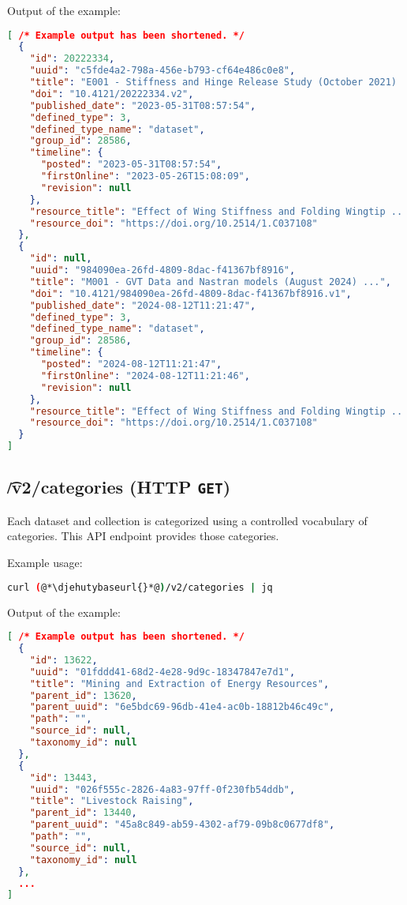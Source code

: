   Output of the example:
\begin{lstlisting}[language=JSON]
[ /* Example output has been shortened. */
  {
    "id": 20222334,
    "uuid": "c5fde4a2-798a-456e-b793-cf64e486c0e8",
    "title": "E001 - Stiffness and Hinge Release Study (October 2021) ...",
    "doi": "10.4121/20222334.v2",
    "published_date": "2023-05-31T08:57:54",
    "defined_type": 3,
    "defined_type_name": "dataset",
    "group_id": 28586,
    "timeline": {
      "posted": "2023-05-31T08:57:54",
      "firstOnline": "2023-05-26T15:08:09",
      "revision": null
    },
    "resource_title": "Effect of Wing Stiffness and Folding Wingtip ...",
    "resource_doi": "https://doi.org/10.2514/1.C037108"
  },
  {
    "id": null,
    "uuid": "984090ea-26fd-4809-8dac-f41367bf8916",
    "title": "M001 - GVT Data and Nastran models (August 2024) ...",
    "doi": "10.4121/984090ea-26fd-4809-8dac-f41367bf8916.v1",
    "published_date": "2024-08-12T11:21:47",
    "defined_type": 3,
    "defined_type_name": "dataset",
    "group_id": 28586,
    "timeline": {
      "posted": "2024-08-12T11:21:47",
      "firstOnline": "2024-08-12T11:21:46",
      "revision": null
    },
    "resource_title": "Effect of Wing Stiffness and Folding Wingtip ...",
    "resource_doi": "https://doi.org/10.2514/1.C037108"
  }
]
\end{lstlisting}

\subsection{\t{/v2/categories} (HTTP \texttt{GET})}
\label{sec:v2-categories}

  Each dataset and collection is categorized using a controlled vocabulary
  of categories.  This API endpoint provides those categories.

  Example usage:
\begin{lstlisting}[language=bash]
curl (@*\djehutybaseurl{}*@)/v2/categories | jq
\end{lstlisting}

  Output of the example:
\begin{lstlisting}[language=JSON]
[ /* Example output has been shortened. */
  {
    "id": 13622,
    "uuid": "01fddd41-68d2-4e28-9d9c-18347847e7d1",
    "title": "Mining and Extraction of Energy Resources",
    "parent_id": 13620,
    "parent_uuid": "6e5bdc69-96db-41e4-ac0b-18812b46c49c",
    "path": "",
    "source_id": null,
    "taxonomy_id": null
  },
  {
    "id": 13443,
    "uuid": "026f555c-2826-4a83-97ff-0f230fb54ddb",
    "title": "Livestock Raising",
    "parent_id": 13440,
    "parent_uuid": "45a8c849-ab59-4302-af79-09b8c0677df8",
    "path": "",
    "source_id": null,
    "taxonomy_id": null
  },
  ...
]
\end{lstlisting}

